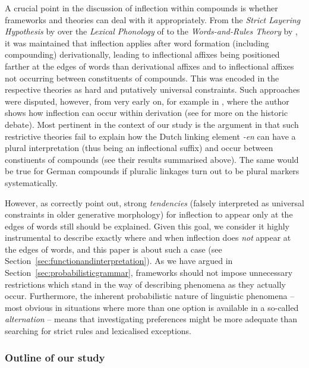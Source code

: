 A crucial point in the discussion of inflection within compounds is whether frameworks and theories can deal with it appropriately.
From the \textit{Strict Layering Hypothesis} by \textcite{Siegel1979} over the \textit{Lexical Phonology} of \textcite{Mohanan1986} to the \textit{Words-and-Rules Theory} by \textcite{Pinker1999}, it was maintained that inflection applies after word formation (including compounding) derivationally, leading to inflectional affixes being positioned farther at the edges of words than derivational affixes and to inflectional affixes not occurring between constituents of compounds.
This was encoded in the respective theories as hard and putatively universal constraints.
Such approaches were disputed, however, from very early on, for example in \textcite{Bochner1984}, where the author shows how inflection can occur within derivation (see \citealt[2--3]{KirchnerNicoladis2009} for more on the historic debate).
Most pertinent in the context of our study is the argument in \textcite[47--48]{BangaEa2013a} that such restrictive theories fail to explain how the Dutch linking element \textit{-en} can have a plural interpretation (thus being an inflectional suffix) and occur between constiuents of compounds (see their results summarised above).
The same would be true for German compounds if pluralic linkages turn out to be plural markers systematically.

However, as \textcite[5]{KirchnerNicoladis2009} correctly point out, strong \textit{tendencies} (falsely interpreted as universal constraints in older generative morphology) for inflection to appear only at the edges of words still should be explained.
Given this goal, we consider it highly instrumental to describe exactly where and when inflection does \textit{not} appear at the edges of words, and this paper is about such a case (see Section~\ref{sec:functionandinterpretation}).
As we have argued in Section~\ref{sec:probabilisticgrammar}, frameworks should not impose unnecessary restrictions which stand in the way of describing phenomena as they actually occur.
Furthermore, the inherent probabilistic nature of linguistic phenomena -- most obvious in situations where more than one option is available in a so-called \textit{alternation} -- means that investigating preferences might be more adequate than searching for strict rules and lexicalised exceptions.

\subsubsection{Outline of our study}


